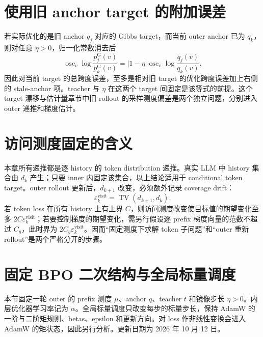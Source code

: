 \documentclass[lang=cn,scheme=chinese,openany]{../book/elegantbook}
\newcommand{\TV}{\operatorname{TV}}
\begin{document}
\section{使用旧 anchor target 的附加误差}

若实际优化的是旧 anchor $q_j$ 对应的 Gibbs target，而当前 outer anchor 已为 $q_k$，则对任意 $\eta>0$，归一化常数消去后
\begin{equation*}
 \operatorname{osc}_v
 \log\frac{p_j^{\mathrm G}(v)}
          {p_k^{\mathrm G}(v)}
 =|1-\eta|\operatorname{osc}_v\log\frac{q_j(v)}{q_k(v)}.
\end{equation*}
因此对当前 target 的总跨度误差，至多是相对旧 target 的优化跨度误差加上右侧的 stale-anchor 项。teacher 与 $\eta$ 在这两个 target 间固定是该等式的前提。这个 target 漂移与估计量章节中旧 rollout 的采样测度偏差是两个独立问题，分别进入 outer 递推和梯度估计。

\section{访问测度固定的含义}

本章所有递推都是逐 history 的 token distribution 递推。真实 LLM 中 history 集合由 $d_k$ 产生；只要 inner 内固定该集合，以上结论适用于 conditional token target。outer rollout 更新后，$d_{k+1}$ 改变，必须额外记录 coverage drift：
\begin{equation*}
 \varepsilon_k^{\mathrm{visit}}=\TV(d_{k+1},d_k).
\end{equation*}
若 token loss 在所有 history 上有上界 $C$，则访问测度改变使目标值的期望变化至多 $2C\varepsilon_k^{\mathrm{visit}}$；若要控制梯度的期望变化，需另行假设逐 prefix 梯度向量的范数不超过 $C_g$，此时界为 $2C_g\varepsilon_k^{\mathrm{visit}}$。因而“固定测度下求解 token 子问题”和“outer 重新 rollout”是两个严格分开的步骤。



\section{固定 BPO 二次结构与全局标量调度}
\label{dyn:scalar}

本节固定一轮 outer 的 prefix 测度 $\mu$、anchor $q$、teacher $t$ 和镜像步长 $\eta>0$。内层优化器学习率记为 $\alpha$。全局标量调度只改变每步的标量步长，保持 AdamW 的一阶与二阶矩规则、betas、epsilon 和更新方向。对 loss 作非线性变换会进入 AdamW 的矩状态，因此另行分析。更新日期为 2026 年 10 月 12 日。
\end{document}
